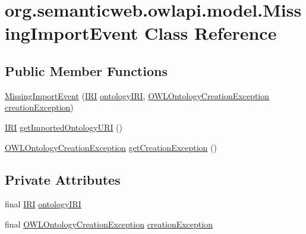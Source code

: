 \hypertarget{classorg_1_1semanticweb_1_1owlapi_1_1model_1_1_missing_import_event}{\section{org.\-semanticweb.\-owlapi.\-model.\-Missing\-Import\-Event Class Reference}
\label{classorg_1_1semanticweb_1_1owlapi_1_1model_1_1_missing_import_event}
}
\subsection*{Public Member Functions}
\begin{DoxyCompactItemize}
\item 
\hyperlink{classorg_1_1semanticweb_1_1owlapi_1_1model_1_1_missing_import_event_a061f09f6d7947522fe8c1426f2749fca}{Missing\-Import\-Event} (\hyperlink{classorg_1_1semanticweb_1_1owlapi_1_1model_1_1_i_r_i}{I\-R\-I} \hyperlink{classorg_1_1semanticweb_1_1owlapi_1_1model_1_1_missing_import_event_a50a0362bb6ced4694269b353389996a5}{ontology\-I\-R\-I}, \hyperlink{classorg_1_1semanticweb_1_1owlapi_1_1model_1_1_o_w_l_ontology_creation_exception}{O\-W\-L\-Ontology\-Creation\-Exception} \hyperlink{classorg_1_1semanticweb_1_1owlapi_1_1model_1_1_missing_import_event_abb84173738deb4eab0f0816cbb54c5ed}{creation\-Exception})
\item 
\hyperlink{classorg_1_1semanticweb_1_1owlapi_1_1model_1_1_i_r_i}{I\-R\-I} \hyperlink{classorg_1_1semanticweb_1_1owlapi_1_1model_1_1_missing_import_event_a628e0a48b5d26968766d78d8de9e55f9}{get\-Imported\-Ontology\-U\-R\-I} ()
\item 
\hyperlink{classorg_1_1semanticweb_1_1owlapi_1_1model_1_1_o_w_l_ontology_creation_exception}{O\-W\-L\-Ontology\-Creation\-Exception} \hyperlink{classorg_1_1semanticweb_1_1owlapi_1_1model_1_1_missing_import_event_adf24ff799808caad83612a692da18a8b}{get\-Creation\-Exception} ()
\end{DoxyCompactItemize}
\subsection*{Private Attributes}
\begin{DoxyCompactItemize}
\item 
final \hyperlink{classorg_1_1semanticweb_1_1owlapi_1_1model_1_1_i_r_i}{I\-R\-I} \hyperlink{classorg_1_1semanticweb_1_1owlapi_1_1model_1_1_missing_import_event_a50a0362bb6ced4694269b353389996a5}{ontology\-I\-R\-I}
\item 
final \hyperlink{classorg_1_1semanticweb_1_1owlapi_1_1model_1_1_o_w_l_ontology_creation_exception}{O\-W\-L\-Ontology\-Creation\-Exception} \hyperlink{classorg_1_1semanticweb_1_1owlapi_1_1model_1_1_missing_import_event_abb84173738deb4eab0f0816cbb54c5ed}{creation\-Exception}
\end{DoxyCompactItemize}


